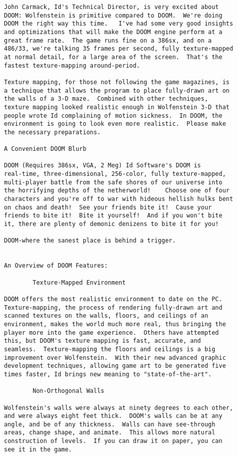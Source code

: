 \begin{verbatim}
John Carmack, Id's Technical Director, is very excited about
DOOM: Wolfenstein is primitive compared to DOOM.  We're doing
DOOM the right way this time.   I've had some very good insights
and optimizations that will make the DOOM engine perform at a
great frame rate.  The game runs fine on a 386sx, and on a
486/33, we're talking 35 frames per second, fully texture-mapped
at normal detail, for a large area of the screen.  That's the
fastest texture-mapping around-period.

Texture mapping, for those not following the game magazines, is
a technique that allows the program to place fully-drawn art on
the walls of a 3-D maze.  Combined with other techniques,
texture mapping looked realistic enough in Wolfenstein 3-D that
people wrote Id complaining of motion sickness.  In DOOM, the
environment is going to look even more realistic.  Please make
the necessary preparations.

A Convenient DOOM Blurb

DOOM (Requires 386sx, VGA, 2 Meg) Id Software's DOOM is
real-time, three-dimensional, 256-color, fully texture-mapped,
multi-player battle from the safe shores of our universe into
the horrifying depths of the netherworld!    Choose one of four
characters and you're off to war with hideous hellish hulks bent
on chaos and death!  See your friends bite it!  Cause your
friends to bite it!  Bite it yourself!  And if you won't bite
it, there are plenty of demonic denizens to bite it for you!

DOOM-where the sanest place is behind a trigger.


An Overview of DOOM Features:

        Texture-Mapped Environment

DOOM offers the most realistic environment to date on the PC. 
Texture-mapping, the process of rendering fully-drawn art and
scanned textures on the walls, floors, and ceilings of an
environment, makes the world much more real, thus bringing the
player more into the game experience.  Others have attempted
this, but DOOM's texture mapping is fast, accurate, and
seamless.  Texture-mapping the floors and ceilings is a big
improvement over Wolfenstein.  With their new advanced graphic
development techniques, allowing game art to be generated five
times faster, Id brings new meaning to "state-of-the-art".

        Non-Orthogonal Walls

Wolfenstein's walls were always at ninety degrees to each other,
and were always eight feet thick.  DOOM's walls can be at any
angle, and be of any thickness.  Walls can have see-through
areas, change shape, and animate.  This allows more natural
construction of levels.  If you can draw it on paper, you can
see it in the game.


\end{verbatim}
